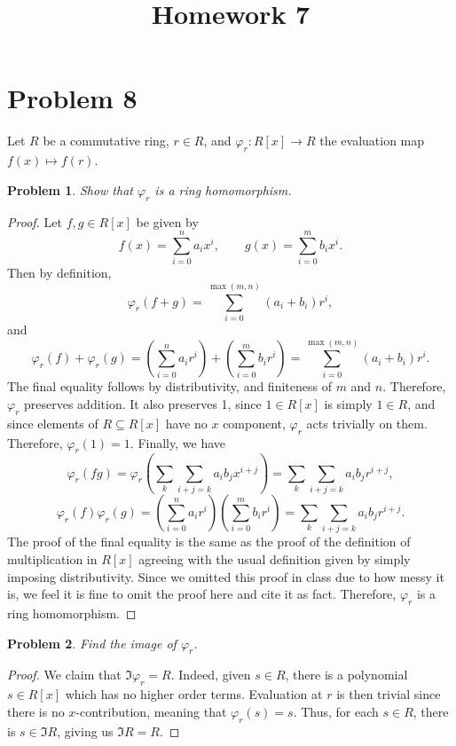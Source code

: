 \documentclass[11pt, letterpaper]{article}
\title{Homework 7}
\theoremstyle{plain}
\newtheorem{problem}{Problem}[section]
\begin{document}
\makeproblem
\setcounter{section}{7}

\section{Problem 8}

Let $R$ be a commutative ring, $r\in R$, and $\varphi _r : R[x] \to R$ the evaluation map $f(x)\mapsto f(r)$.

\begin{problem}
	Show that $\varphi_r$ is a ring homomorphism.
\end{problem}
\begin{proof}
	Let $f,g\in R[x]$ be given by
	\[
		f(x)=\sum_{i=0}^{n} a_ix^i,\qquad g(x)=\sum_{i=0}^{m} b_ix^i
	.\]
	Then by definition,
	\[
		\varphi_r (f+g)=\sum_{i=0}^{\max (m,n)} (a_i+b_i)r^i,
	\]
	and
	\[
		\varphi_r(f)+\varphi _r(g)=\left( \sum_{i=0}^{n} a_ir^i \right) +\left( \sum_{i=0}^{m} b_ir^i \right) =\sum_{i=0}^{\max (m,n)} (a_i+b_i)r^i
	.\]
	The final equality follows by distributivity, and finiteness of $m$ and $n$. Therefore, $\varphi_r $ preserves addition. It also preserves 1, since $1\in R[x]$ is simply $1\in R$, and since elements of $R\subseteq R[x]$ have no $x$ component, $\varphi _r$ acts trivially on them. Therefore, $\varphi _r(1)=1$. Finally, we have
	\[
		\varphi _r(fg)=\varphi _r\left( \sum_{k} \sum_{i+j=k} a_ib_jx^{i+j}  \right) =\sum_{k} \sum_{i+j=k} a_ib_jr^{i+j} ,
	\]
	\[
		\varphi_r(f)\varphi _r(g)=\left( \sum_{i=0}^{n} a_ir^i \right) \left( \sum_{i=0}^{m} b_ir^i \right) =\sum_{k} \sum_{i+j=k} a_ib_jr^{i+j} 
	.\]
	The proof of the final equality is the same as the proof of the definition of multiplication in $R[x]$ agreeing with the usual definition given by simply imposing distributivity. Since we omitted this proof in class due to how messy it is, we feel it is fine to omit the proof here and cite it as fact. Therefore, $\varphi _r$ is a ring homomorphism.
\end{proof}

\begin{problem}
	Find the image of $\varphi _r$.
\end{problem}
\begin{proof}
	We claim that $\Im \varphi _r=R$. Indeed, given $s\in R$, there is a polynomial $s\in R[x]$ which has no higher order terms. Evaluation at $r$ is then trivial since there is no $x$-contribution, meaning that $\varphi _r(s)=s$. Thus, for each $s\in R$, there is $s\in \Im R$, giving us $\Im R=R$.
\end{proof}
\end{document}
